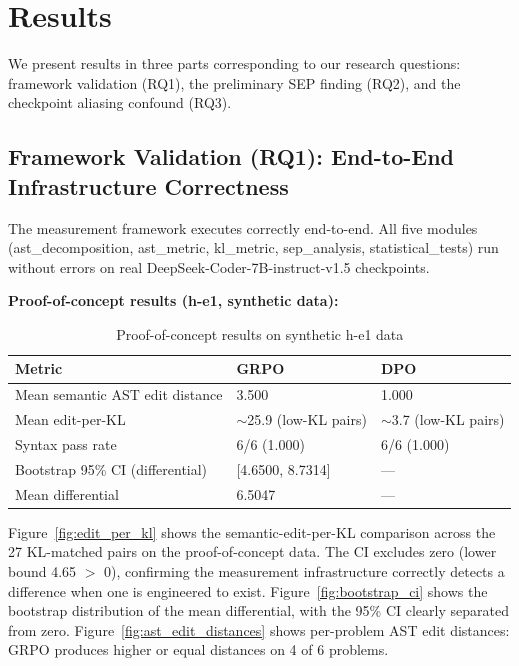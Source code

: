 \section{Results}
\label{sec:results}

We present results in three parts corresponding to our research questions:
framework validation (RQ1), the preliminary SEP finding (RQ2), and the
checkpoint aliasing confound (RQ3).

\subsection{Framework Validation (RQ1): End-to-End Infrastructure Correctness}

The measurement framework executes correctly end-to-end. All five modules
(ast\_decomposition, ast\_metric, kl\_metric, sep\_analysis, statistical\_tests)
run without errors on real DeepSeek-Coder-7B-instruct-v1.5 checkpoints.

\textbf{Proof-of-concept results (h-e1, synthetic data):}

\begin{table}[h]
\centering
\caption{Proof-of-concept results on synthetic h-e1 data}
\label{tab:poc_results}
\begin{tabular}{lll}
\toprule
\textbf{Metric} & \textbf{GRPO} & \textbf{DPO} \\
\midrule
Mean semantic AST edit distance & 3.500 & 1.000 \\
Mean edit-per-KL & $\sim$25.9 (low-KL pairs) & $\sim$3.7 (low-KL pairs) \\
Syntax pass rate & 6/6 (1.000) & 6/6 (1.000) \\
Bootstrap 95\% CI (differential) & [4.6500, 8.7314] & --- \\
Mean differential & 6.5047 & --- \\
\bottomrule
\end{tabular}
\end{table}

Figure~\ref{fig:edit_per_kl} shows the semantic-edit-per-KL comparison across the 27 KL-matched
pairs on the proof-of-concept data. The CI excludes zero (lower bound 4.65 $>$ 0),
confirming the measurement infrastructure correctly detects a difference when
one is engineered to exist. Figure~\ref{fig:bootstrap_ci} shows the bootstrap distribution of the
mean differential, with the 95\% CI clearly separated from zero. Figure~\ref{fig:ast_edit_distances}
shows per-problem AST edit distances: GRPO produces higher or equal distances on 4 of 6 problems.

